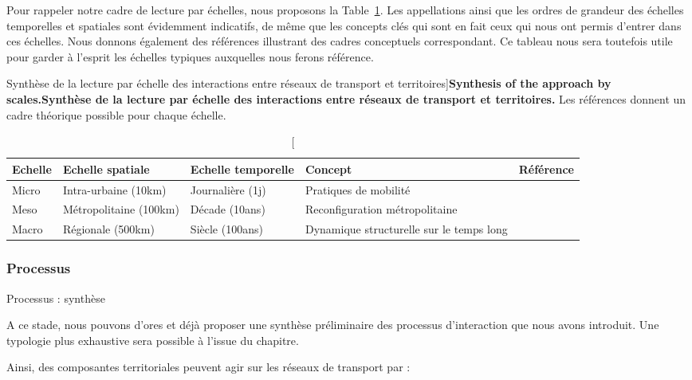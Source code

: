 Pour rappeler notre cadre de lecture par échelles, nous proposons la Table~\ref{tab:networkterritories:scales}. Les appellations ainsi que les ordres de grandeur des échelles temporelles et spatiales sont évidemment indicatifs, de même que les concepts clés qui sont en fait ceux qui nous ont permis d'entrer dans ces échelles. Nous donnons également des références illustrant des cadres conceptuels correspondant. Ce tableau nous sera toutefois utile pour garder à l'esprit les échelles typiques auxquelles nous ferons référence.



\begin{table}
\caption[Synthesis of the approach by scales][Synthèse de la lecture par échelle des interactions entre réseaux de transport et territoires]{\textbf{Synthesis of the approach by scales.}\label{tab:networkterritories:scales}}{\textbf{Synthèse de la lecture par échelle des interactions entre réseaux de transport et territoires.} Les références donnent un cadre théorique possible pour chaque échelle.\label{tab:networkterritories:scales}}
\begin{tabular}{|p{1.7cm}|p{3.7cm}|p{3.7cm}|p{3.7cm}|p{2.7cm}|}\hline
	Echelle & Echelle spatiale & Echelle temporelle & Concept & Référence \\ \hline
	Micro & Intra-urbaine (10km) & Journalière (1j) & Pratiques de mobilité & \cite{hall2005reconsidering} \\ \hline
	Meso & Métropolitaine (100km) & Décade (10ans) & Reconfiguration métropolitaine & \cite{wegener2004land} \\\hline
	Macro & Régionale (500km) & Siècle (100ans) & Dynamique structurelle sur le temps long & \cite{pumain1997pour} \\\hline
\end{tabular}
\end{table}





\subsubsection{Processus}{Processus : synthèse}

A ce stade, nous pouvons d'ores et déjà proposer une synthèse préliminaire des processus d'interaction que nous avons introduit. Une typologie plus exhaustive sera possible à l'issue du chapitre.

Ainsi, des composantes territoriales peuvent agir sur les réseaux de transport par :


